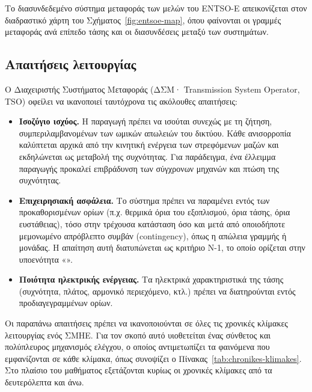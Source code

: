Το διασυνδεδεμένο σύστημα μεταφοράς των μελών του ENTSO-E απεικονίζεται στον διαδραστικό
χάρτη του Σχήματος~\ref{fig:entsoe-map}, όπου φαίνονται οι γραμμές μεταφοράς ανά επίπεδο
τάσης και οι διασυνδέσεις μεταξύ των συστημάτων.



\subsection{Απαιτήσεις λειτουργίας}

Ο Διαχειριστής Συστήματος Μεταφοράς (ΔΣΜ· Transmission System Operator, TSO) οφείλει να
ικανοποιεί ταυτόχρονα τις ακόλουθες απαιτήσεις:

\begin{itemize}
\item \textbf{Ισοζύγιο ισχύος.} Η παραγωγή πρέπει να ισούται συνεχώς με τη ζήτηση, συμπεριλαμβανομένων των ωμικών απωλειών του δικτύου. Κάθε ανισορροπία καλύπτεται αρχικά από την κινητική ενέργεια των στρεφόμενων μαζών και εκδηλώνεται ως μεταβολή της συχνότητας. Για παράδειγμα, ένα
      έλλειμμα παραγωγής προκαλεί επιβράδυνση των σύγχρονων μηχανών και πτώση της συχνότητας.
\item \textbf{Επιχειρησιακή ασφάλεια.} Το σύστημα πρέπει να παραμένει εντός των προκαθορισμένων ορίων (π.χ. θερμικά όρια του εξοπλισμού, όρια τάσης, όρια ευστάθειας), τόσο στην τρέχουσα κατάσταση όσο και μετά από οποιοδήποτε μεμονωμένο απρόβλεπτο συμβάν (contingency), όπως η απώλεια γραμμής ή μονάδας. Η απαίτηση αυτή διατυπώνεται ως κριτήριο N-1, το οποίο ορίζεται στην υποενότητα
      «».
\item \textbf{Ποιότητα ηλεκτρικής ενέργειας.} Τα ηλεκτρικά χαρακτηριστικά της τάσης (συχνότητα, πλάτος, αρμονικό περιεχόμενο, κτλ.) πρέπει να
      διατηρούνται εντός προδιαγεγραμμένων ορίων.
\end{itemize}

Οι παραπάνω απαιτήσεις πρέπει να ικανοποιούνται σε όλες τις χρονικές κλίμακες λειτουργίας ενός
ΣΜΗΕ. Για τον σκοπό αυτό υιοθετείται ένας σύνθετος και πολύπλευρος μηχανισμός ελέγχου, ο οποίος
αντιμετωπίζει τα φαινόμενα που εμφανίζονται σε κάθε κλίμακα, όπως συνοψίζει ο
Πίνακας~\ref{tab:chronikes-klimakes}. Στο πλαίσιο του μαθήματος εξετάζονται κυρίως οι χρονικές
κλίμακες από τα δευτερόλεπτα και άνω.

